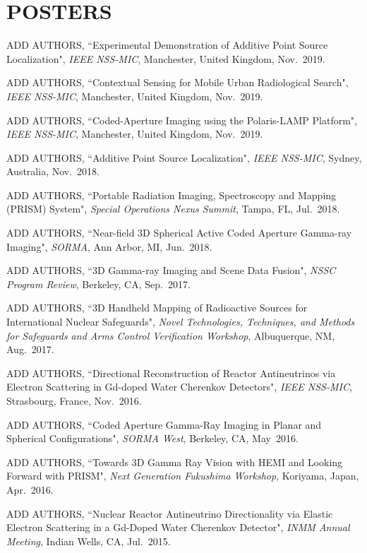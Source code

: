 \section{\small{POSTERS}}

\vspace{10pt}
\begin{enumerate}[label={[\arabic*]}, leftmargin=*, labelsep=10pt, align=left]
    \item ADD AUTHORS, ``Experimental Demonstration of Additive Point Source Localization", \emph{IEEE NSS-MIC}, Manchester, United Kingdom, Nov.~2019.
    \item ADD AUTHORS, ``Contextual Sensing for Mobile Urban Radiological Search", \emph{IEEE NSS-MIC}, Manchester, United Kingdom, Nov.~2019.
    \item ADD AUTHORS, ``Coded-Aperture Imaging using the Polaris-LAMP Platform", \emph{IEEE NSS-MIC}, Manchester, United Kingdom, Nov.~2019.
    \item ADD AUTHORS, ``Additive Point Source Localization", \emph{IEEE NSS-MIC}, Sydney, Australia, Nov.~2018.
    \item ADD AUTHORS, ``Portable Radiation Imaging, Spectroscopy and Mapping (PRISM) System", \emph{Special Operations Nexus Summit}, Tampa, FL, Jul.~2018.
    \item ADD AUTHORS, ``Near-field 3D Spherical Active Coded Aperture Gamma-ray Imaging", \emph{SORMA}, Ann Arbor, MI, Jun.~2018.
    \item ADD AUTHORS, ``3D Gamma-ray Imaging and Scene Data Fusion", \emph{NSSC Program Review}, Berkeley, CA, Sep.~2017.
    \item ADD AUTHORS, ``3D Handheld Mapping of Radioactive Sources for International Nuclear Safeguards", \emph{Novel Technologies, Techniques, and Methods for Safeguards and Arms Control Verification Workshop}, Albuquerque, NM, Aug.~2017.
    \item ADD AUTHORS, ``Directional Reconstruction of Reactor Antineutrinos via Electron Scattering in Gd-doped Water Cherenkov Detectors", \emph{IEEE NSS-MIC}, Strasbourg, France, Nov.~2016.
    \item ADD AUTHORS, ``Coded Aperture Gamma-Ray Imaging in Planar and Spherical Configurations", \emph{SORMA West}, Berkeley, CA, May~2016.
    \item ADD AUTHORS, ``Towards 3D Gamma Ray Vision with HEMI and Looking Forward with PRISM", \emph{Next Generation Fukushima Workshop}, Koriyama, Japan, Apr.~2016.
    \item ADD AUTHORS, ``Nuclear Reactor Antineutrino Directionality via Elastic Electron Scattering in a Gd-Doped Water Cherenkov Detector", \emph{INMM Annual Meeting}, Indian Wells, CA, Jul.~2015.
\end{enumerate}
